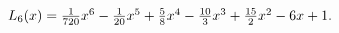 $\mathop{L_{6}\/}\nolimits\!\left(x\right)=\tfrac{1}{720}x^{6}-\tfrac{1}{20}x^{%
5}+\tfrac{5}{8}x^{4}-\tfrac{10}{3}x^{3}+\tfrac{15}{2}x^{2}-6x+1.$